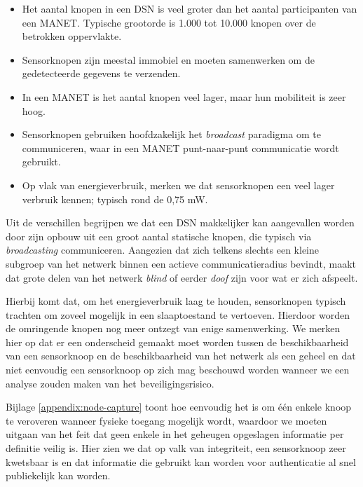 \begin{itemize}

  \item Het aantal knopen in een DSN is veel groter dan het aantal
  participanten van een MANET. Typische grootorde is 1.000 tot 10.000 knopen
  over de betrokken oppervlakte.

  \item Sensorknopen zijn meestal immobiel en moeten samenwerken om de
  gedetecteerde gegevens te verzenden.

  \item In een MANET is het aantal knopen veel lager, maar hun mobiliteit is
  zeer hoog.

  \item Sensorknopen gebruiken hoofdzakelijk het \emph{broadcast} paradigma om
  te communiceren, waar in een MANET punt-naar-punt communicatie wordt gebruikt.

  \item Op vlak van energieverbruik, merken we dat sensorknopen een veel lager
  verbruik kennen; typisch rond de 0,75 mW.

\end{itemize}

Uit de verschillen begrijpen we dat een DSN makkelijker kan aangevallen worden
door zijn opbouw uit een groot aantal statische knopen, die typisch via
\emph{broadcasting} communiceren. Aangezien dat zich telkens slechts een kleine
subgroep van het netwerk binnen een actieve communicatieradius bevindt, maakt
dat grote delen van het netwerk \emph{blind} of eerder \emph{doof} zijn voor
wat er zich afspeelt.

Hierbij komt dat, om het energieverbruik laag te houden, sensorknopen typisch
trachten om zoveel mogelijk in een slaaptoestand te vertoeven. Hierdoor worden
de omringende knopen nog meer ontzegt van enige samenwerking. We merken hier op
dat er een onderscheid gemaakt moet worden tussen de beschikbaarheid van een
sensorknoop en de beschikbaarheid van het netwerk als een geheel en dat niet
eenvoudig een sensorknoop op zich mag beschouwd worden wanneer we een analyse
zouden maken van het beveiligingsrisico.

Bijlage \ref{appendix:node-capture} toont hoe eenvoudig het is om \'e\'en enkele
knoop te veroveren wanneer fysieke toegang mogelijk wordt, waardoor we moeten
uitgaan van het feit dat geen enkele in het geheugen opgeslagen informatie per
definitie veilig is. Hier zien we dat op valk van integriteit, een sensorknoop
zeer kwetsbaar is en dat informatie die gebruikt kan worden voor authenticatie
al snel publiekelijk kan worden.

